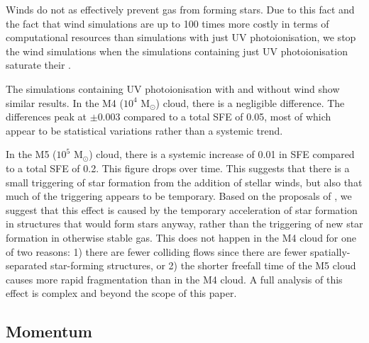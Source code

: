 \documentclass[a4paper,fleqn,usenatbib]{mnras}
\newcommand{\Msolar}{M$_{\odot}$\xspace}
\begin{document}
Winds do not as effectively prevent gas from forming stars. Due to this fact and the fact that wind simulations are up to 100 times more costly in terms of computational resources than simulations with just UV photoionisation, we stop the wind simulations when the simulations containing just UV photoionisation saturate their \SFE.

The simulations containing UV photoionisation with and without wind show similar results. In the M4 ($10^4$ \Msolar) cloud, there is a negligible difference. The differences peak at $\pm$0.003 compared to a total SFE of 0.05, most of which appear to be statistical variations rather than a systemic trend.

In the M5 ($10^5$ \Msolar) cloud, there is a systemic increase of 0.01 in SFE compared to a total SFE of 0.2. This figure drops over time. This suggests that there is a small triggering of star formation from the addition of stellar winds, but also that much of the triggering appears to be temporary. Based on the proposals of \cite{Dale2015}, we suggest that this effect is caused by the temporary acceleration of star formation in structures that would form stars anyway, rather than the triggering of new star formation in otherwise stable gas. This does not happen in the M4 cloud for one of two reasons: 1) there are fewer colliding flows since there are fewer spatially-separated star-forming structures, or 2) the shorter freefall time of the M5 cloud causes more rapid fragmentation than in the M4 cloud. A full analysis of this effect is complex and beyond the scope of this paper.

\subsection{Momentum}
\end{document}
